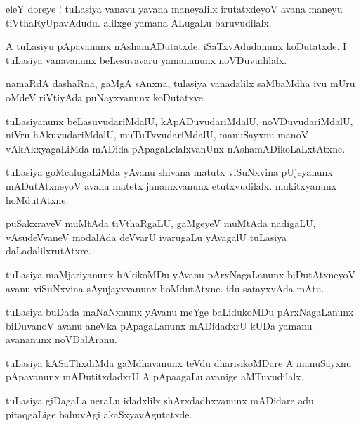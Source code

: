 \documentclass{article}
\begin{document}
\begin{mn}%
eleY doreye ! tuLasiya vanavu yavana maneyalilx irutatxdeyoV avana maneyu tiVthaRyUpavAdudu. 
alilxge yamana ALugaLu baruvudilalx.
\end{mn}

\begin{mn}%
A tuLasiyu pApavanunx nAshamADutatxde. iSaTxvAdudanunx koDutatxde. I tuLasiya vanavanunx 
beLesuvavaru yamananunx noVDuvudilalx.
\end{mn}

\begin{mn}%
namaRdA dashaRna, gaMgA sAnxna, tulasiya vanadalilx saMbaMdha ivu mUru oMdeV riVtiyAda puNayxvanunx 
koDutatxve.
\end{mn}

\begin{mn}%
tuLasiyanunx beLasuvudariMdalU, kApADuvudariMdalU, noVDuvudariMdalU, niVru hAkuvudariMdalU, 
muTuTxvudariMdalU, manuSayxnu manoV vAkAkxyagaLiMda mADida pApagaLelalxvanUnx nAshamADikoLaLxtAtxne.
\end{mn}

\begin{mn}%
tuLasiya goMcalugaLiMda yAvanu shivana matutx viSuNxvina pUjeyanunx mADutAtxneyoV avanu matetx 
janamxvanunx etutxvudilalx. mukitxyanunx hoMdutAtxne.
\end{mn}

\begin{mn}%
puSakxraveV muMtAda tiVthaRgaLU, gaMgeyeV muMtAda nadigaLU, vAsudeVvaneV modalAda deVvarU ivarugaLu 
yAvagalU tuLasiya daLadalilxrutAtxre.
\end{mn}

\begin{mn}%
tuLasiya maMjariyanunx hAkikoMDu yAvanu pArxNagaLanunx biDutAtxneyoV avanu viSuNxvina 
sAyujayxvanunx hoMdutAtxne. idu satayxvAda mAtu.
\end{mn}

\begin{mn}%
tuLasiya buDada maNaNxnunx yAvanu meYge baLidukoMDu pArxNagaLanunx biDuvanoV avanu aneVka 
pApagaLanunx mADidadxrU kUDa yamanu avananunx noVDalAranu.
\end{mn}

\begin{mn}%
tuLasiya kASaThxdiMda gaMdhavanunx teVdu dharisikoMDare A manuSayxnu pApavanunx mADutitxdadxrU A 
pApaagaLu avanige aMTuvudilalx.
\end{mn}

\begin{mn}%
tuLasiya giDagaLa neraLu idadxlilx shArxdadhxvanunx mADidare adu pitaqgaLige bahuvAgi 
akaSxyavAgutatxde.
\end{mn}
\end{document}
